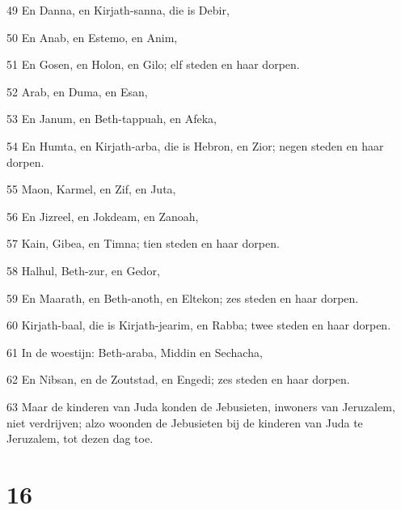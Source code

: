 \par 49 En Danna, en Kirjath-sanna, die is Debir,
\par 50 En Anab, en Estemo, en Anim,
\par 51 En Gosen, en Holon, en Gilo; elf steden en haar dorpen.
\par 52 Arab, en Duma, en Esan,
\par 53 En Janum, en Beth-tappuah, en Afeka,
\par 54 En Humta, en Kirjath-arba, die is Hebron, en Zior; negen steden en haar dorpen.
\par 55 Maon, Karmel, en Zif, en Juta,
\par 56 En Jizreel, en Jokdeam, en Zanoah,
\par 57 Kain, Gibea, en Timna; tien steden en haar dorpen.
\par 58 Halhul, Beth-zur, en Gedor,
\par 59 En Maarath, en Beth-anoth, en Eltekon; zes steden en haar dorpen.
\par 60 Kirjath-baal, die is Kirjath-jearim, en Rabba; twee steden en haar dorpen.
\par 61 In de woestijn: Beth-araba, Middin en Sechacha,
\par 62 En Nibsan, en de Zoutstad, en Engedi; zes steden en haar dorpen.
\par 63 Maar de kinderen van Juda konden de Jebusieten, inwoners van Jeruzalem, niet verdrijven; alzo woonden de Jebusieten bij de kinderen van Juda te Jeruzalem, tot dezen dag toe.

\chapter{16}

